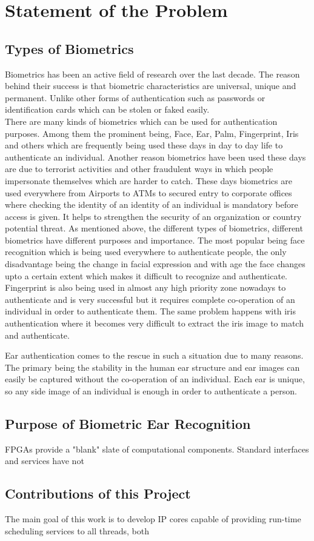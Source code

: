 \chapter{Statement of the Problem}
\label{sec:problem}

\section{Types of Biometrics} Biometrics has been an active field of research over the last decade. The reason behind their success is that biometric characteristics are universal, unique and permanent. Unlike other forms of authentication such as passwords or identification cards which can be stolen or faked easily.\\

There are many kinds of biometrics which can be used for authentication purposes. Among them the prominent being, Face, Ear, Palm, Fingerprint, Iris and others which are frequently being used these days in day to day life to authenticate an individual. Another reason biometrics have been used these days are due to terrorist activities and other fraudulent ways in which people impersonate themselves which are harder to catch. These days biometrics are used everywhere from Airports to ATMs to secured entry to corporate offices where checking the identity of an identity of an individual is mandatory before access is given. It helps to strengthen the security of an organization or country potential threat. As mentioned above, the different types of biometrics, different biometrics have different purposes and importance. The most popular being face recognition which is being used everywhere to authenticate people, the only disadvantage being the change in facial expression and with age the face changes upto a certain extent which makes it difficult to recognize and authenticate. Fingerprint is also being used in almost any high priority zone nowadays to authenticate and is very successful but it requires complete co-operation of an individual in order to authenticate them. The same problem happens with iris authentication where it becomes very difficult to extract the iris image to match and authenticate. 

Ear authentication comes to the rescue in such a situation due to many reasons. The primary being the stability in the human ear structure and ear images can easily be captured without the co-operation of an individual. Each ear is unique, so any side image of an individual is enough in order to authenticate a person.

\section{Purpose of Biometric Ear Recognition} FPGAs provide a "blank"
slate of computational components.  Standard interfaces and services have not

\section{Contributions of this Project} The main goal of this work is to develop
IP cores capable of providing run-time scheduling services to all threads, both
